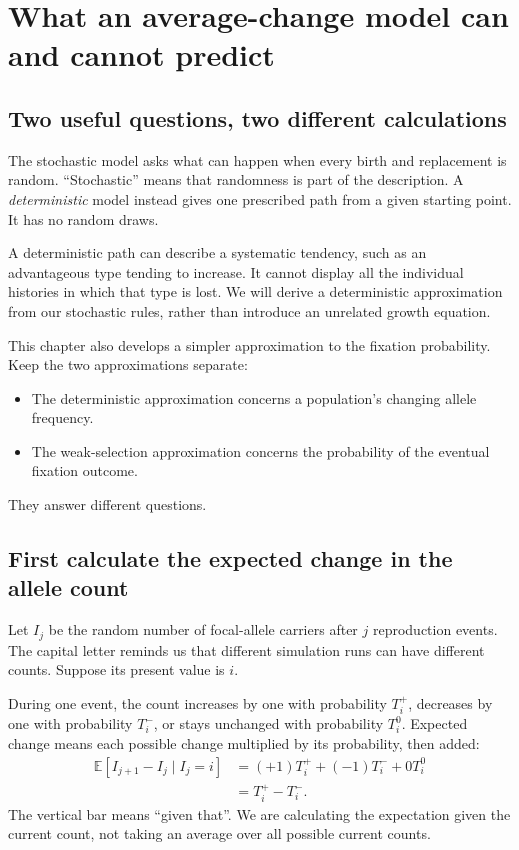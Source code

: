 \chapter{What an average-change model can and cannot predict}
\label{ch:deterministic}

\section{Two useful questions, two different calculations}

The stochastic model asks what can happen when every birth and replacement is random. ``Stochastic'' means that randomness is part of the description. A \emph{deterministic} model instead gives one prescribed path from a given starting point. It has no random draws.

A deterministic path can describe a systematic tendency, such as an advantageous type tending to increase. It cannot display all the individual histories in which that type is lost. We will derive a deterministic approximation from our stochastic rules, rather than introduce an unrelated growth equation.

This chapter also develops a simpler approximation to the fixation probability. Keep the two approximations separate:
\begin{itemize}
\item The deterministic approximation concerns a population's changing allele frequency.
\item The weak-selection approximation concerns the probability of the eventual fixation outcome.
\end{itemize}
They answer different questions.

\section{First calculate the expected change in the allele count}

Let $I_j$ be the random number of focal-allele carriers after $j$ reproduction events. The capital letter reminds us that different simulation runs can have different counts. Suppose its present value is $i$.

During one event, the count increases by one with probability $T_i^+$, decreases by one with probability $T_i^-$, or stays unchanged with probability $T_i^0$. Expected change means each possible change multiplied by its probability, then added:
\begin{align}
\mathbb E[I_{j+1}-I_j\mid I_j=i]
&=(+1)T_i^++(-1)T_i^-+0T_i^0\\
&=T_i^+-T_i^-.
\label{eq:expected-count-step}
\end{align}
The vertical bar means ``given that''. We are calculating the expectation given the current count, not taking an average over all possible current counts.

